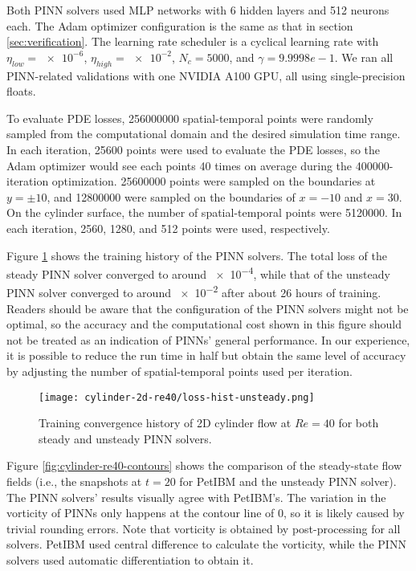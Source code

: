 Both PINN solvers used MLP networks with \num{6} hidden layers and \num{512} neurons each.
The Adam optimizer configuration is the same as that in section \ref{sec:verification}.
The learning rate scheduler is a cyclical learning rate with $\eta_{low}=\num{e-6}$, $\eta_{high}=\num{e-2}$, $N_c=\num{5000}$, and $\gamma={9.9998e-1}$.
We ran all PINN-related validations with one NVIDIA A100 GPU,
all using single-precision floats.

To evaluate PDE losses, \num{256000000} spatial-temporal points were randomly sampled from the computational domain and the desired simulation time range.
In each iteration, \num{25600} points were used to evaluate the PDE losses, so the Adam optimizer would see each points \num{40} times on average during the \num{400000}-iteration optimization.
\num{25600000} points were sampled on the boundaries at $y=\pm 10$, and \num{12800000} were sampled on the boundaries of $x=-10$ and $x=30$.
On the cylinder surface, the number of spatial-temporal points were \num{5120000}.
In each iteration, \num{2560}, \num{1280}, and \num{512} points were used, respectively.

Figure \ref{fig:cylinder-re40-pinn-loss} shows the training history of the PINN solvers.
The total loss of the steady PINN solver converged to around \num{e-4}, while that of the unsteady PINN solver converged to around \num{e-2} after about 26 hours of training.
Readers should be aware that the configuration of the PINN solvers might not be optimal, so the accuracy and the computational cost shown in this figure should not be treated as an indication of PINNs' general performance.
In our experience, it is possible to reduce the run time in half but obtain the same level of accuracy by adjusting the number of spatial-temporal points used per iteration.

\begin{figure}
    \centering%
    \texttt{[image: cylinder-2d-re40/loss-hist-unsteady.png]}%
    \caption{%
        Training convergence history of 2D cylinder flow at $Re=\num{40}$ for both steady and unsteady PINN solvers.
    }
    \label{fig:cylinder-re40-pinn-loss}%
\end{figure}

Figure \ref{fig:cylinder-re40-contours} shows the comparison of the steady-state flow fields (i.e., the snapshots at $t=20$ for PetIBM and the unsteady PINN solver).
The PINN solvers' results visually agree with PetIBM's.
The variation in the vorticity of PINNs only happens at the contour line of \num{0}, so it is likely caused by trivial rounding errors.
Note that vorticity is obtained by post-processing for all solvers.
PetIBM used central difference to calculate the vorticity, while the PINN solvers used automatic differentiation to obtain it.

